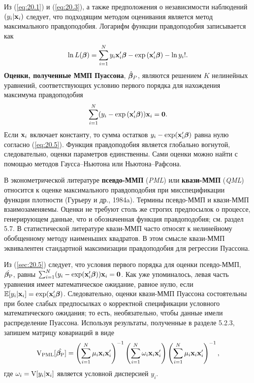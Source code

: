 Из (\ref{eq:20.1}) и (\ref{eq:20.3}), а также предположения о независимости наблюдений $(y_i|\mathbf{x}_i)$ следует, что подходящим методом оценивания является метод максимального правдоподобия. Логарифм функции правдоподобия записывается как
    \begin{align}\label{eq:20.4}
    \ln L(\bm{\beta}) = \sum^{N}_{i=1} {y_i\mathbf{x}_i'\bm{\beta} - \exp{(\mathbf{x}_i'\bm{\beta}) - \ln y_i !}}.
    \end{align}
\textbf{Оценки, полученные ММП Пуассона}, $\hat{\bm{\beta}}_P$, являются решением $K$ нелинейных уравнений, соответствующих условию первого порядка для нахождения максимума правдоподобия
    \begin{align}\label{eq:20.5}
    \sum^{N}_{i=1} (y_i - \exp{(\mathbf{x}_i'\bm{\beta})})\mathbf{x}_i = \textbf{0}.
    \end{align}
Если $\mathbf{x}_i$ включает константу, то сумма остатков $y_i - \exp(\mathbf{x}_i'\bm{\beta})$ равна нулю согласно (\ref{eq:20.5}). Функция правдоподобия является глобально вогнутой, следовательно, оценки параметров единственны. Сами оценки можно найти с помощью методов Гаусса--Ньютона или Ньютона--Рафсона.

В эконометрической литературе \textbf{псевдо-ММП} (\textit{PML}) или \textbf{квази-ММП} (\textit{QML}) относится к оценке максимального правдоподобия при мисспецификации функции плотности (Гурьеру и др., 1984a). Термины псевдо-ММП и квази-ММП взаимозаменяемы. Оценки не требуют столь же строгих предпосылок о процессе, генерирующем данные, что и обозначенная функция правдоподобия; см. раздел 5.7. %
В статистической литературе квази-ММП часто относят к нелинейному обобщенному методу наименьших квадратов. В этом смысле квази-ММП эквивалентен стандартной максимизации правдоподобия для регрессии Пуассона.

Из (\ref{sec:20.5}) следует, что условия первого порядка для оценки псевдо-ММП, $\hat{\bm{\beta}_{\mathrm{P}}}$, равны $\sum^{N}_{i = 1} (y_i - \exp(\mathbf{x}_i'\bm{\beta}))\mathbf{x}_i = \mathbf{0}$. Как уже упоминалось, левая часть уравнения имеет математическое ожидание, равное нулю, если $\mathbb{E}[y_i|\mathbf{x}_i] = \exp(\mathbf{x}_i'\bm{\beta})$. Следовательно, оценки квази-ММП Пуассона состоятельны при более слабых предпосылках о корректной спецификации условного математического ожидания; то есть, необязательно, чтобы данные имели распределение Пуассона. Используя результаты, полученные в разделе 5.2.3, %
запишем матрицу ковариаций в виде
    \begin{align}\label{eq:20.6}
    \mathrm{V}_{\mathrm{PML}}[\hat{\bm{\beta}_{\mathrm{P}}}] = \left( \sum^{N}_{i = 1} \mu_i \mathbf{x}_i\mathbf{x}'_i \right)^{-1} \left( \sum^{N}_{i = 1} \omega_i \mathbf{x}_i\mathbf{x}'_i \right) \left( \sum^{N}_{i = 1} \mu_i \mathbf{x}_i\mathbf{x}'_i \right)^{-1},
    \end{align}
где $\omega_i = \mathrm{V}[y_i|\mathbf{x}_i]$ является условной дисперсией $y_i$.

